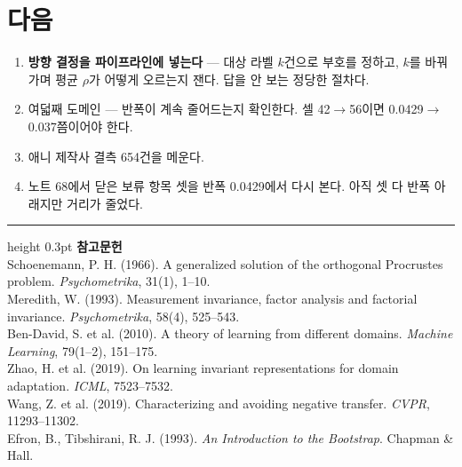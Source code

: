 \documentclass[10pt]{article}
\begin{document}
\section{다음}

\begin{enumerate}[leftmargin=1.3em,itemsep=0.15em]
\item \textbf{방향 결정을 파이프라인에 넣는다} --- 대상 라벨 $k$건으로 부호를
      정하고, $k$를 바꿔 가며 평균 $\rho$가 어떻게 오르는지 잰다. 답을 안 보는
      정당한 절차다.
\item 여덟째 도메인 --- 반폭이 계속 줄어드는지 확인한다. 셀 42$\to$56이면
      0.0429$\to$0.037쯤이어야 한다.
\item 애니 제작사 결측 654건을 메운다.
\item 노트 68에서 닫은 보류 항목 셋을 반폭 0.0429에서 다시 본다. 아직 셋 다
      반폭 아래지만 거리가 줄었다.
\end{enumerate}

\vspace{0.6em}
\hrule height 0.3pt
\vspace{0.5em}
{\footnotesize
\textbf{참고문헌}\\[0.3em]
Schoenemann, P. H. (1966). A generalized solution of the orthogonal Procrustes
problem. \emph{Psychometrika}, 31(1), 1--10.\\[0.15em]
Meredith, W. (1993). Measurement invariance, factor analysis and factorial
invariance. \emph{Psychometrika}, 58(4), 525--543.\\[0.15em]
Ben-David, S. et al. (2010). A theory of learning from different domains.
\emph{Machine Learning}, 79(1--2), 151--175.\\[0.15em]
Zhao, H. et al. (2019). On learning invariant representations for domain
adaptation. \emph{ICML}, 7523--7532.\\[0.15em]
Wang, Z. et al. (2019). Characterizing and avoiding negative transfer.
\emph{CVPR}, 11293--11302.\\[0.15em]
Efron, B., Tibshirani, R. J. (1993). \emph{An Introduction to the Bootstrap}.
Chapman \& Hall.
}
\end{document}
